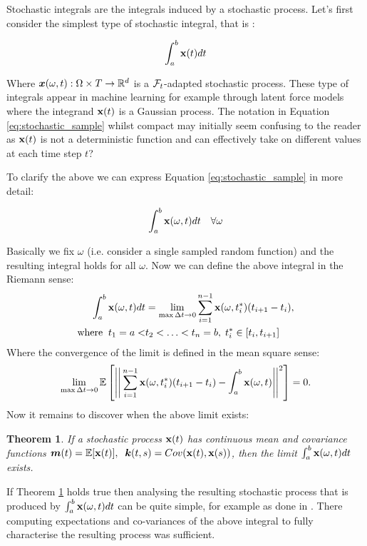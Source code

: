 \documentclass[a4paper,12pt,twoside,openright]{report}
\newtheorem{theorem}{Theorem}
\theoremstyle{definition}
\begin{document}
Stochastic integrals are the integrals induced by a stochastic process. Let's first consider the simplest type of stochastic integral, that is :

\begin{align} \label{eq:stochastic_sample}
    \int_{a}^{b} {\mathbf{x}}(t) dt
\end{align}

Where ${\bm{x}}(\omega, t): \Omega \times T \rightarrow {\mathbb{R}}^d$ is a ${\mathcal{F}}_t$-adapted stochastic process. These type of integrals appear in machine learning for example through latent force models \cite{alvarez2009latent,alvarez2013linear} where the integrand ${\mathbf{x}}(t)$ is a Gaussian process. The notation in Equation \ref{eq:stochastic_sample} whilst compact may initially seem confusing to the reader as ${\mathbf{x}}(t)$ is not a deterministic function and can effectively take on different values at each time step $t$?

To clarify the above we can express  Equation \ref{eq:stochastic_sample} in more detail:

\begin{align*}
    \int_{a}^{b} {\mathbf{x}}(\omega, t) dt \quad \forall \omega
\end{align*}

Basically we fix $\omega$ (i.e. consider a single sampled random function) and the resulting integral holds for all $\omega$.  Now we can define the above integral in the Riemann sense:
\begin{align*}
    \int_{a}^{b} {\mathbf{x}}(\omega, t) dt &= \lim_{ \max \Delta t \rightarrow 0} \sum_{i=1}^{n-1} {\mathbf{x}}(\omega, t_i^{*}) (t_{i+1} - t_i), \\
    \text{where} \;\; t_1 = a < &t_2 < \hdots < t_n = b, \;  t_i^{*} \in [ t_i, t_{i+1}]
\end{align*}
Where the convergence of the limit is defined in the mean square sense:
\begin{align*}
    \lim_{\max \Delta t \rightarrow 0} \mathbb{E} \left[ \Bigg|\Bigg|\sum_{i=1}^{n-1} {\mathbf{x}}(\omega, t_i^{*}) (t_{i+1} - t_i)-  \int_{a}^{b} {\mathbf{x}}(\omega, t) \Bigg|\Bigg|^2\right] =  0.
\end{align*}
Now it remains to discover when the above limit exists:
\begin{theorem}\label{thrm:ito_simple}
  If a stochastic process ${\mathbf{x}}(t)$ has continuous mean and covariance functions ${\bm{m}}(t) = \mathbb{E}[{\mathbf{x}}(t)],\;\; {\bm{k}}(t, s) = Cov({\mathbf{x}}(t), {\mathbf{x}}(s))$, then the limit $\int_{a}^{b} {\mathbf{x}}(\omega, t) dt$ exists.
\end{theorem}
If Theorem \ref{thrm:ito_simple} holds true then analysing the resulting stochastic process that is produced by $\int_{a}^{b} {\mathbf{x}}(\omega, t) dt$ can be quite simple, for example as done in \cite{alvarez2009latent}. There computing expectations and co-variances of the above integral to fully characterise the resulting process was sufficient.
 
\end{document}
